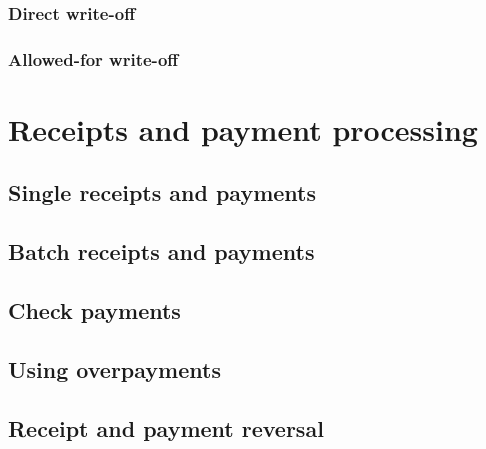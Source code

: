 \subsection{Direct write-off}

\subsection{Allowed-for write-off}


\chapter{Receipts and payment processing}


\section{Single receipts and payments}
\label{sec:SinglePayments}



\section{Batch receipts and payments}


\section{Check payments}


\section{Using overpayments}
\label{sec:UsingOverpayments}

\section{Receipt and payment reversal}

